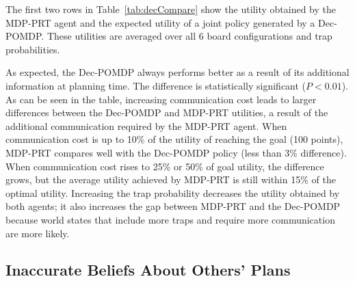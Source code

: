    
   The first two rows in Table~\ref{tab:decCompare} show the utility obtained by the MDP-PRT agent and the expected utility of a joint policy generated by a Dec-POMDP.
   These utilities are averaged over all 6 board configurations and trap probabilities. 
   
    
    \begin{table}[h]
    \vspace{-0.2cm}
    \centering
    \small
    \caption{The performance of MDP-PRT (with accurate and inaccurate beliefs) and an optimal Dec-POMDP approach.}
     \label{tab:decCompare}
       \vspace{-0.3cm}
    \end{table}
   

  As expected, the Dec-POMDP always performs better as a result of its additional information at planning time. The difference is statistically significant ($P<0.01$).  
  As can be seen in the table, increasing communication cost leads to larger differences between the Dec-POMDP and MDP-PRT utilities, a result of the additional communication required by the MDP-PRT agent. When communication cost is up to 10\% of the utility of reaching the goal (100 points), MDP-PRT compares well with the Dec-POMDP policy (less than 3\% difference). When communication cost rises to 25\% or 50\% of goal utility, the difference grows, but the average utility achieved by MDP-PRT is still within 15\% of the optimal utility. Increasing the trap probability decreases the utility obtained by both agents; it also increases the gap between MDP-PRT and the  Dec-POMDP because world states that include more traps and require more communication are more likely.

 
 \subsection{Inaccurate Beliefs About Others' Plans}

